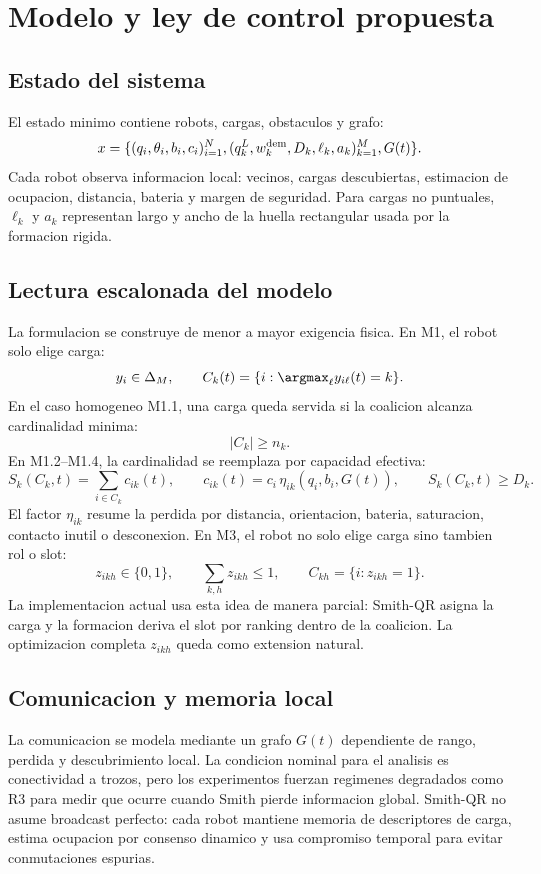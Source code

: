 \section{Modelo y ley de control propuesta}

\subsection{Estado del sistema}

El estado minimo contiene robots, cargas, obstaculos y grafo:
\[
  x = \{(q_i,\theta_i,b_i,c_i)_{i=1}^{N},
  (q_k^L,w_k^{\rm dem},D_k,\ell_k,a_k)_{k=1}^{M}, G(t)\}.
\]
Cada robot observa informacion local: vecinos, cargas descubiertas, estimacion de
ocupacion, distancia, bateria y margen de seguridad. Para cargas no puntuales, $\ell_k$
y $a_k$ representan largo y ancho de la huella rectangular usada por la formacion rigida.

\subsection{Lectura escalonada del modelo}

La formulacion se construye de menor a mayor exigencia fisica. En M1, el robot solo
elige carga:
\[
  y_i \in \Delta_M,\qquad
  C_k(t)=\{i:\argmax_{\ell} y_{i\ell}(t)=k\}.
\]
En el caso homogeneo M1.1, una carga queda servida si la coalicion alcanza cardinalidad
minima:
\[
  |C_k| \ge n_k .
\]
En M1.2--M1.4, la cardinalidad se reemplaza por capacidad efectiva:
\[
  S_k(C_k,t)=\sum_{i\in C_k} c_{ik}(t),\qquad
  c_{ik}(t)=c_i\,\eta_{ik}(q_i,b_i,G(t)),
  \qquad S_k(C_k,t)\ge D_k .
\]
El factor $\eta_{ik}$ resume la perdida por distancia, orientacion, bateria, saturacion,
contacto inutil o desconexion. En M3, el robot no solo elige carga sino tambien rol o
slot:
\[
  z_{ikh}\in\{0,1\},\qquad
  \sum_{k,h} z_{ikh}\le 1,\qquad
  C_{kh}=\{i:z_{ikh}=1\}.
\]
La implementacion actual usa esta idea de manera parcial: Smith-QR asigna la carga y la
formacion deriva el slot por ranking dentro de la coalicion. La optimizacion completa
$z_{ikh}$ queda como extension natural.

\subsection{Comunicacion y memoria local}

La comunicacion se modela mediante un grafo $G(t)$ dependiente de rango, perdida y
descubrimiento local. La condicion nominal para el analisis es conectividad a trozos,
pero los experimentos fuerzan regimenes degradados como R3 para medir que ocurre cuando
Smith pierde informacion global. Smith-QR no asume broadcast perfecto: cada robot
mantiene memoria de descriptores de carga, estima ocupacion por consenso dinamico y usa
compromiso temporal para evitar conmutaciones espurias.

